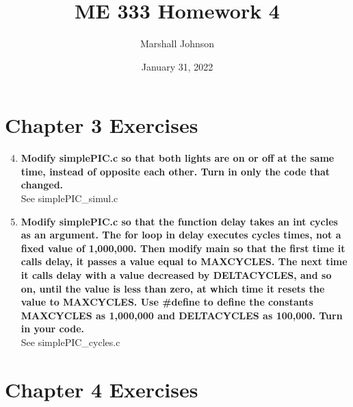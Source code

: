 \documentclass{article}
\title{ME 333 Homework 4}
\author{Marshall Johnson}
\date{January 31, 2022}
\begin{document}
\maketitle

\section*{Chapter 3 Exercises}

\begin{enumerate}[label=\textbf{\arabic*})]
    \setcounter{enumi}{3}
    \item \textbf{Modify simplePIC.c so that both lights are on or off at the same time, instead of opposite
    each other. Turn in only the code that changed.} \\

    See simplePIC\_simul.c

    \item \textbf{ Modify simplePIC.c so that the function delay takes an int cycles as an argument. The
    for loop in delay executes cycles times, not a fixed value of 1,000,000. Then modify main
    so that the first time it calls delay, it passes a value equal to MAXCYCLES. The next time it
    calls delay with a value decreased by DELTACYCLES, and so on, until the value is less than
    zero, at which time it resets the value to MAXCYCLES. Use \#define to define the constants
    MAXCYCLES as 1,000,000 and DELTACYCLES as 100,000. Turn in your code.} \\

    See simplePIC\_cycles.c

\end{enumerate}

\pagebreak
\section*{Chapter 4 Exercises}
\end{document}
